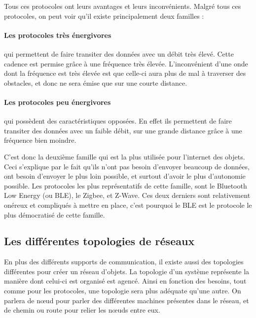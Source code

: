 Tous ces protocoles ont leurs avantages et leurs inconvénients. Malgré tous ces protocoles, on peut voir qu'il existe principalement deux familles :

\paragraph{Les protocoles très énergivores}qui permettent de faire transiter des données avec un débit très élevé. Cette cadence est permise grâce à une fréquence très élevée. L'inconvénient d'une onde dont la fréquence est très élevée est que celle-ci aura plus de mal à traverser des obstacles, et donc ne sera émise que sur une courte distance.

\paragraph{Les protocoles peu énergivores}qui possèdent des caractéristiques opposées. En effet ils permettent de faire transiter des données avec un faible débit, sur une grande distance grâce à une fréquence bien moindre.

C'est donc la deuxième famille qui est la plus utilisée pour l'internet des objets. Ceci s'explique par le fait qu'ils n'ont pas besoin d'envoyer beaucoup de données, ont besoin d'envoyer le plus loin possible, et surtout d'avoir le plus d'autonomie possible. Les protocoles les plus représentatifs de cette famille, sont le Bluetooth Low Energy (ou BLE), le Zigbee, et Z-Wave. Ces deux derniers sont relativement onéreux et compliqués à mettre en place, c'est pourquoi le BLE est le protocole le plus démocratisé de cette famille.

	\subsection{Les différentes topologies de réseaux}
En plus des différents supports de communication, il existe aussi des topologies différentes pour créer un réseau d'objets. La topologie d'un système représente la manière dont celui-ci est organisé est agencé. Ainsi en fonction des besoins, tout comme pour les protocoles, une topologie sera plus adéquate qu'une autre. On parlera de nœud pour parler des différentes machines présentes dans le réseau, et de chemin ou route pour relier les nœuds entre eux.

